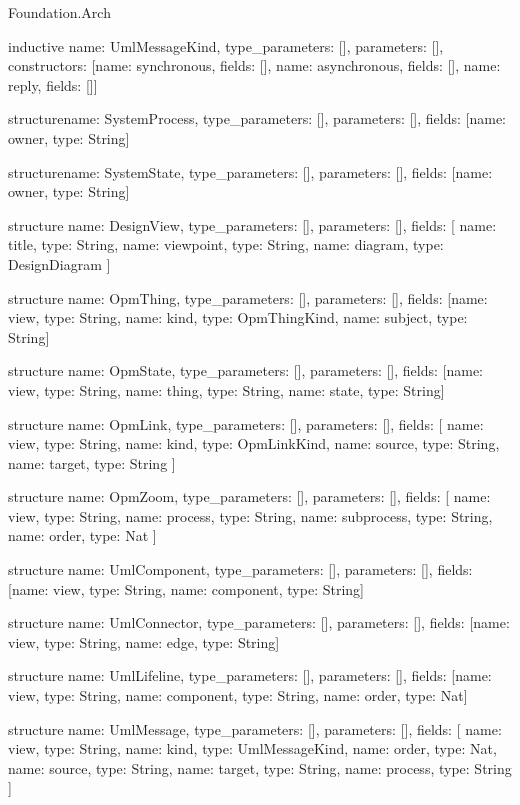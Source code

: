 \begin{lexlean}{Foundation.Arch}
\begin{semanticmodule}
inductive{
  name: UmlMessageKind,
  type_parameters: [],
  parameters: [],
  constructors: [{name: synchronous, fields: []}, {name: asynchronous, fields: []}, {name: reply, fields: []}]
}

structure{name: SystemProcess, type_parameters: [], parameters: [], fields: [{name: owner, type: String}]}

structure{name: SystemState, type_parameters: [], parameters: [], fields: [{name: owner, type: String}]}

structure{
  name: DesignView,
  type_parameters: [],
  parameters: [],
  fields: [
    {name: title, type: String},
    {name: viewpoint, type: String},
    {name: diagram, type: DesignDiagram}
  ]
}

structure{
  name: OpmThing,
  type_parameters: [],
  parameters: [],
  fields: [{name: view, type: String}, {name: kind, type: OpmThingKind}, {name: subject, type: String}]
}

structure{
  name: OpmState,
  type_parameters: [],
  parameters: [],
  fields: [{name: view, type: String}, {name: thing, type: String}, {name: state, type: String}]
}

structure{
  name: OpmLink,
  type_parameters: [],
  parameters: [],
  fields: [
    {name: view, type: String},
    {name: kind, type: OpmLinkKind},
    {name: source, type: String},
    {name: target, type: String}
  ]
}

structure{
  name: OpmZoom,
  type_parameters: [],
  parameters: [],
  fields: [
    {name: view, type: String},
    {name: process, type: String},
    {name: subprocess, type: String},
    {name: order, type: Nat}
  ]
}

structure{
  name: UmlComponent,
  type_parameters: [],
  parameters: [],
  fields: [{name: view, type: String}, {name: component, type: String}]
}

structure{
  name: UmlConnector,
  type_parameters: [],
  parameters: [],
  fields: [{name: view, type: String}, {name: edge, type: String}]
}

structure{
  name: UmlLifeline,
  type_parameters: [],
  parameters: [],
  fields: [{name: view, type: String}, {name: component, type: String}, {name: order, type: Nat}]
}

structure{
  name: UmlMessage,
  type_parameters: [],
  parameters: [],
  fields: [
    {name: view, type: String},
    {name: kind, type: UmlMessageKind},
    {name: order, type: Nat},
    {name: source, type: String},
    {name: target, type: String},
    {name: process, type: String}
  ]
}


\end{semanticmodule}
\end{lexlean}
